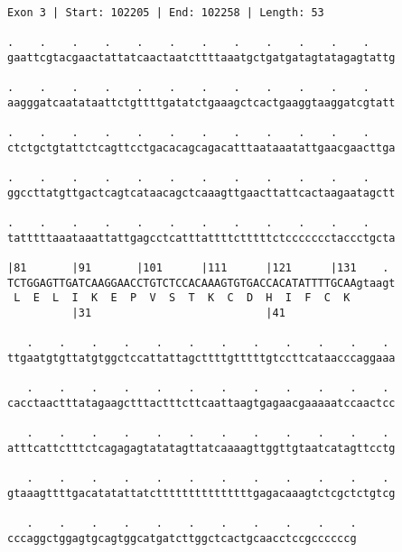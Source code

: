 \documentclass{article}
\begin{document}
\begin{Verbatim}
Exon 3 | Start: 102205 | End: 102258 | Length: 53
 
.    .    .    .    .    .    .    .    .    .    .    .    
gaattcgtacgaactattatcaactaatcttttaaatgctgatgatagtatagagtattg
  
.    .    .    .    .    .    .    .    .    .    .    .    
aagggatcaatataattctgttttgatatctgaaagctcactgaaggtaaggatcgtatt
  
.    .    .    .    .    .    .    .    .    .    .    .    
ctctgctgtattctcagttcctgacacagcagacatttaataaatattgaacgaacttga
  
.    .    .    .    .    .    .    .    .    .    .    .    
ggccttatgttgactcagtcataacagctcaaagttgaacttattcactaagaatagctt
  
.    .    .    .    .    .    .    .    .    .    .    .    
tatttttaaataaattattgagcctcatttattttctttttctccccccctaccctgcta
  
|81       |91       |101      |111      |121      |131    . 
TCTGGAGTTGATCAAGGAACCTGTCTCCACAAAGTGTGACCACATATTTTGCAAgtaagt
 L  E  L  I  K  E  P  V  S  T  K  C  D  H  I  F  C  K       
          |31                           |41                 
  
   .    .    .    .    .    .    .    .    .    .    .    . 
ttgaatgtgttatgtggctccattattagcttttgtttttgtccttcataacccaggaaa
  
   .    .    .    .    .    .    .    .    .    .    .    . 
cacctaactttatagaagctttactttcttcaattaagtgagaacgaaaaatccaactcc
  
   .    .    .    .    .    .    .    .    .    .    .    . 
atttcattctttctcagagagtatatagttatcaaaagttggttgtaatcatagttcctg
  
   .    .    .    .    .    .    .    .    .    .    .    . 
gtaaagttttgacatatattatctttttttttttttttgagacaaagtctcgctctgtcg
  
   .    .    .    .    .    .    .    .    .    .    .
cccaggctggagtgcagtggcatgatcttggctcactgcaacctccgccccccg
\end{Verbatim}
\newpage
\end{document}
